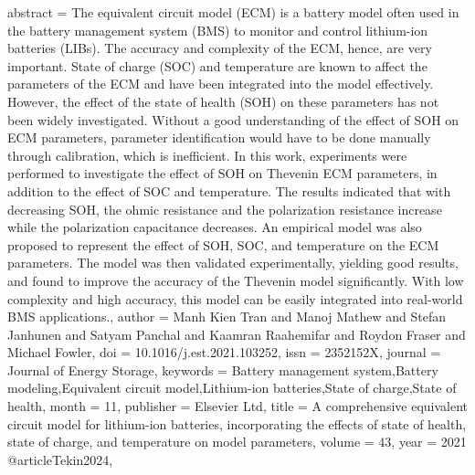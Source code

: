 {{{{{{{{{{   abstract = {The equivalent circuit model (ECM) is a battery model often used in the battery management system (BMS) to monitor and control lithium-ion batteries (LIBs). The accuracy and complexity of the ECM, hence, are very important. State of charge (SOC) and temperature are known to affect the parameters of the ECM and have been integrated into the model effectively. However, the effect of the state of health (SOH) on these parameters has not been widely investigated. Without a good understanding of the effect of SOH on ECM parameters, parameter identification would have to be done manually through calibration, which is inefficient. In this work, experiments were performed to investigate the effect of SOH on Thevenin ECM parameters, in addition to the effect of SOC and temperature. The results indicated that with decreasing SOH, the ohmic resistance and the polarization resistance increase while the polarization capacitance decreases. An empirical model was also proposed to represent the effect of SOH, SOC, and temperature on the ECM parameters. The model was then validated experimentally, yielding good results, and found to improve the accuracy of the Thevenin model significantly. With low complexity and high accuracy, this model can be easily integrated into real-world BMS applications.},
   author = {Manh Kien Tran and Manoj Mathew and Stefan Janhunen and Satyam Panchal and Kaamran Raahemifar and Roydon Fraser and Michael Fowler},
   doi = {10.1016/j.est.2021.103252},
   issn = {2352152X},
   journal = {Journal of Energy Storage},
   keywords = {Battery management system,Battery modeling,Equivalent circuit model,Lithium-ion batteries,State of charge,State of health},
   month = {11},
   publisher = {Elsevier Ltd},
   title = {A comprehensive equivalent circuit model for lithium-ion batteries, incorporating the effects of state of health, state of charge, and temperature on model parameters},
   volume = {43},
   year = {2021}
}
@article{Tekin2024,
}}}}}}}}}}
